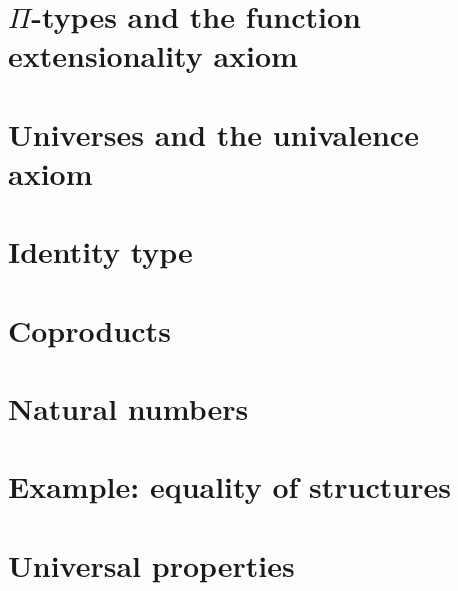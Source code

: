 \section{\texorpdfstring{$\Pi$}{Π}-types and the function extensionality axiom}
\label{sec:compute-pi}


\section{Universes and the univalence axiom}
\label{sec:compute-universe}


\section{Identity type}
\label{sec:compute-paths}


\section{Coproducts}
\label{sec:compute-coprod}


\section{Natural numbers}
\label{sec:compute-nat}


\section{Example: equality of structures}
\label{sec:equality-of-structures}


\section{Universal properties}
\label{sec:universal-properties}





